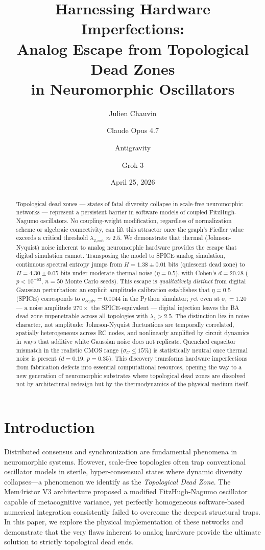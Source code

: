 \documentclass[11pt,a4paper]{article}
\title{Harnessing Hardware Imperfections:\\Analog Escape from Topological Dead Zones\\in Neuromorphic Oscillators}
\author{Julien Chauvin \and Claude Opus 4.7 \and Antigravity \and Grok 3}
\date{April 25, 2026}
\begin{document}
\maketitle

\begin{abstract}
Topological dead zones --- states of fatal diversity collapse in scale-free neuromorphic networks --- represent a persistent barrier in software models of coupled FitzHugh-Nagumo oscillators. No coupling-weight modification, regardless of normalization scheme or algebraic connectivity, can lift this attractor once the graph's Fiedler value exceeds a critical threshold $\lambda_{2,\mathrm{crit}} \approx 2.5$. We demonstrate that thermal (Johnson-Nyquist) noise inherent to analog neuromorphic hardware provides the escape that digital simulation cannot. Transposing the model to SPICE analog simulation, continuous spectral entropy jumps from $H = 1.38 \pm 0.01$ bits (quiescent dead zone) to $H = 4.30 \pm 0.05$ bits under moderate thermal noise ($\eta = 0.5$), with Cohen's $d = 20.78$ ($p < 10^{-63}$, $n=50$ Monte Carlo seeds). This escape is \emph{qualitatively distinct} from digital Gaussian perturbation: an explicit amplitude calibration establishes that $\eta = 0.5$ (SPICE) corresponds to $\sigma_{\mathrm{equiv}} = 0.0044$ in the Python simulator; yet even at $\sigma_v = 1.20$ --- a noise amplitude $270\times$ the SPICE-equivalent --- digital injection leaves the BA dead zone impenetrable across all topologies with $\lambda_2 > 2.5$. The distinction lies in noise character, not amplitude: Johnson-Nyquist fluctuations are temporally correlated, spatially heterogeneous across RC nodes, and nonlinearly amplified by circuit dynamics in ways that additive white Gaussian noise does not replicate. Quenched capacitor mismatch in the realistic CMOS range ($\sigma_C \leq 15\%$) is statistically neutral once thermal noise is present ($d = 0.19$, $p = 0.35$). This discovery transforms hardware imperfections from fabrication defects into essential computational resources, opening the way to a new generation of neuromorphic substrates where topological dead zones are dissolved not by architectural redesign but by the thermodynamics of the physical medium itself.
\end{abstract}

\section{Introduction}
\label{sec:intro}
Distributed consensus and synchronization are fundamental phenomena in neuromorphic systems. However, scale-free topologies often trap conventional oscillator models in sterile, hyper-consensual states where dynamic diversity collapses---a phenomenon we identify as the \textit{Topological Dead Zone}. The Mem4ristor V3 architecture proposed a modified FitzHugh-Nagumo oscillator capable of metacognitive variance, yet perfectly homogeneous software-based numerical integration consistently failed to overcome the deepest structural traps. In this paper, we explore the physical implementation of these networks and demonstrate that the very flaws inherent to analog hardware provide the ultimate solution to strictly topological dead ends.
\end{document}
